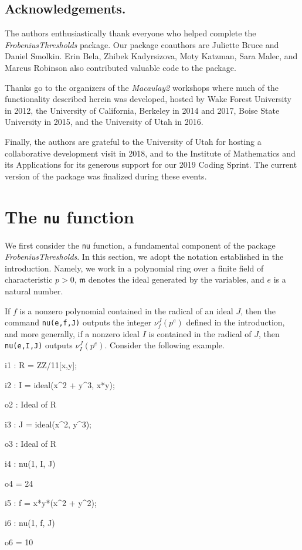\documentclass{amsart}
\newcommand{\idealm}{\mathfrak{m}}
\begin{document}
\subsection*{Acknowledgements.}  The authors enthusiastically thank everyone who helped complete the \emph{FrobeniusThresholds} package.
Our package coauthors are Juliette Bruce and Daniel Smolkin.  Erin Bela, Zhibek Kadyrsizova, Moty Katzman, Sara Malec, and Marcus Robinson also contributed valuable code to the package.

Thanks go to the organizers of the \emph{Macaulay2} workshops where much of the functionality described herein was developed, hosted by Wake Forest University in 2012, the University of California, Berkeley in 2014 and 2017, Boise State University in 2015, and the University of Utah in 2016.

Finally, the authors are grateful to the University of Utah for hosting a collaborative development visit in 2018, and to the Institute of Mathematics and its Applications for its generous support for our 2019 Coding Sprint.
The current version of the package was finalized during these events.

\section{The {\tt nu} function}
\label{sec.Nu}


We first consider the \texttt{nu} function, a fundamental component of the package \emph{FrobeniusThresholds}.   In this section, we adopt the notation established in the introduction.  Namely, we work in a polynomial ring over a finite field of characteristic $p>0$,  $\idealm$ denotes the ideal generated by the variables, and $e$ is a natural number.

If $f$ is a nonzero polynomial contained in the radical of an ideal $J$, then the command \texttt{nu(e,f,J)} outputs the integer $\nu_f^J(p^e)$ defined in the introduction, and
more generally, if a nonzero ideal $I$ is contained in the radical of $J$, then \texttt{nu(e,I,J)} outputs $\nu_I^J(p^e)$. Consider the following example.  %

\bigskip
{\small
{}
\begin{MyVerbatim}
i1 : R = ZZ/11[x,y];

i2 : I = ideal(x^2 + y^3, x*y);

o2 : Ideal of R

i3 : J = ideal(x^2, y^3);

o3 : Ideal of R

i4 : nu(1, I, J)

o4 = 24

i5 : f = x*y*(x^2 + y^2);

i6 : nu(1, f, J)

o6 = 10
\end{MyVerbatim}
}
\bigskip
\end{document}

